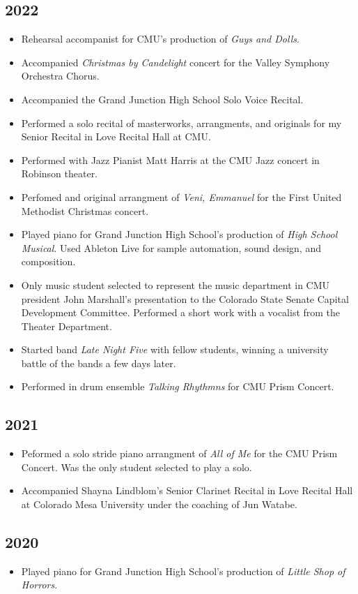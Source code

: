 \documentclass{article}
\newcommand{\cvItem}[1]{
        \item {
            {#1}
        }
    }
\newcommand{\cvItemListStart}{\begin{itemize}[leftmargin=10pt]}
\newcommand{\cvItemListEnd}{\end{itemize}}
\begin{document}
        \subsection{2022}
            \cvItemListStart
                \cvItem{Rehearsal accompanist for CMU's production of {\em Guys and Dolls}.}
                \cvItem{Accompanied {\em Christmas by Candelight} concert for the Valley Symphony
                Orchestra Chorus.}
                \cvItem{Accompanied the Grand Junction High School Solo Voice Recital.}
                \cvItem{Performed a solo recital of masterworks, arrangments, and originals for my
                Senior Recital in Love Recital Hall at CMU.}
                \cvItem{Performed with Jazz Pianist Matt Harris at the CMU Jazz concert in Robinson
                theater.}
                \cvItem{Perfomed and original arrangment of {\em Veni, Emmanuel} for the First
                United Methodist Christmas concert.}
                \cvItem{Played piano for Grand Junction High School's production of {\em High School
                Musical}. Used Ableton Live for sample automation, sound design, and composition.}
                \cvItem{Only music student selected to represent the music department in CMU
                president John Marshall's presentation to the Colorado State Senate Capital
                Development Committee. Performed a short work with a vocalist from the Theater
                Department.}
                \cvItem{Started band {\em Late Night Five} with fellow students, winning a
                university battle of the bands a few days later.}
                \cvItem{Performed in drum ensemble {\em Talking Rhythmns} for CMU Prism Concert.}
            \cvItemListEnd
        \subsection{2021}
            \cvItemListStart
                \cvItem{Peformed a solo stride piano arrangment of {\em All of Me} for the CMU Prism
                Concert. Was the only student selected to play a solo.}
                \cvItem{Accompanied Shayna Lindblom's Senior Clarinet Recital in Love Recital Hall
                at Colorado Mesa University under the coaching of Jun Watabe.}
            \cvItemListEnd
        \subsection{2020}
            \cvItemListStart
                \cvItem{Played piano for Grand Junction High School's production of {\em Little Shop
                of Horrors}.}
            \cvItemListEnd
\end{document}
